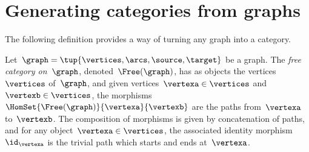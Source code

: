 
\section{Generating categories from graphs}
\label{sec:catsfromgraphs}

The following definition provides a way of turning any graph into a category.

\begin{ctdefinition}
    \label{def:free-category}
    Let~$\graph=\tup{\vertices,\arcs,\source,\target}$ be a graph.
    The \emph{free category on~$\graph$}, denoted~$\Free(\graph)$, has as objects the vertices~$\vertices$ of~$\graph$, and given vertices~$\vertexa\in \vertices$ and~$\vertexb\in \vertices$, the morphisms~$\HomSet{\Free(\graph)}{\vertexa}{\vertexb}$ are the paths from~$\vertexa$ to~$\vertexb$.
    The composition of morphisms is given by concatenation of paths, and for any object~$\vertexa \in \vertices$, the associated identity morphism~$\id_\vertexa$ is the trivial path which starts and ends at~$\vertexa$.
\end{ctdefinition}


